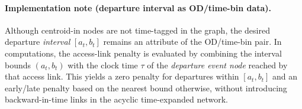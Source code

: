 \paragraph{Implementation note (departure interval as OD/time-bin data).}
Although centroid-in nodes are not time-tagged in the graph, the desired departure
\emph{interval} $[a_t,b_t]$ remains an attribute of the OD/time-bin pair. In computations,
the access-link penalty is evaluated by combining the interval bounds $(a_t,b_t)$ with the
clock time $\tau$ of the \emph{departure event node} reached by that access link. This yields
a zero penalty for departures within $[a_t,b_t]$ and an early/late penalty based on the
nearest bound otherwise, without introducing backward-in-time links in the acyclic
time-expanded network.

